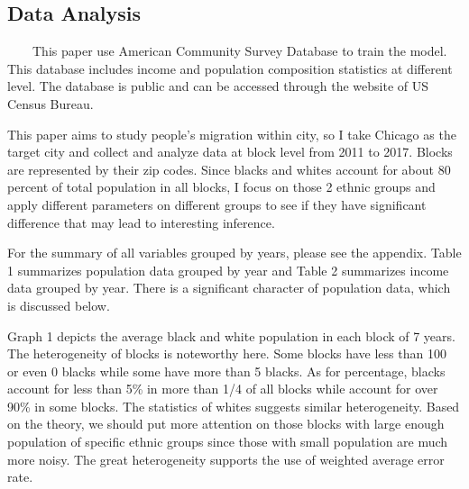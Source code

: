 \documentclass{article}
\begin{document}
\subsection{Data Analysis}
\par \ \ \ \ This paper use American Community Survey Database to train the model. This database includes income and population composition statistics at different level. The database is public and can be accessed through the website of US Census Bureau.
\par This paper aims to study people’s migration within city, so I take Chicago as the target city and collect and analyze data at block level from 2011 to 2017. Blocks are represented by their zip codes. Since blacks and whites account for about 80 percent of total population in all blocks, I focus on those 2 ethnic groups and apply different parameters on different groups to see if they have significant difference that may lead to interesting inference.
\par For the summary of all variables grouped by years, please see the appendix. Table 1 summarizes population data grouped by year and Table 2 summarizes income data grouped by year. There is a significant character of population data, which is discussed below.
\par Graph 1 depicts the average black and white population in each block of 7 years. The heterogeneity of blocks is noteworthy here. Some blocks have less than 100 or even 0 blacks while some have more than 5 blacks. As for percentage, blacks account for less than 5\% in more than 1/4 of all blocks while account for over 90\% in some blocks. The statistics of whites suggests similar heterogeneity. Based on the theory, we should put more attention on those blocks with large enough population of specific ethnic groups since those with small population are much more noisy. The great heterogeneity supports the use of weighted average error rate.
\end{document}
